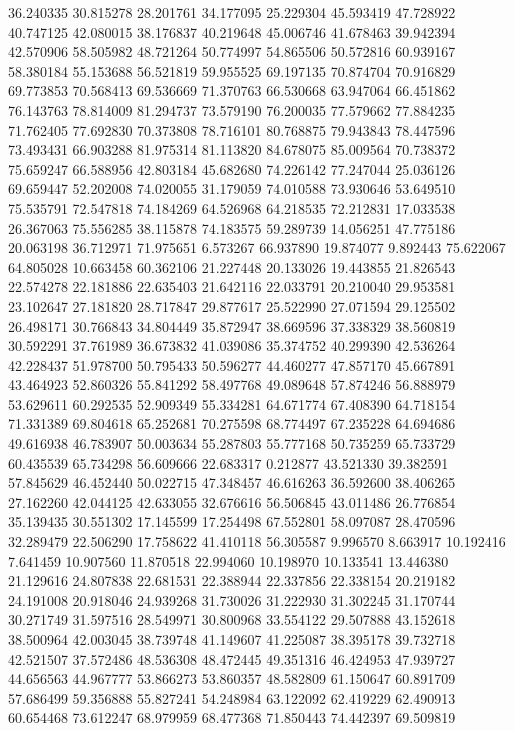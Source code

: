 36.240335
30.815278
28.201761
34.177095
25.229304
45.593419
47.728922
40.747125
42.080015
38.176837
40.219648
45.006746
41.678463
39.942394
42.570906
58.505982
48.721264
50.774997
54.865506
50.572816
60.939167
58.380184
55.153688
56.521819
59.955525
69.197135
70.874704
70.916829
69.773853
70.568413
69.536669
71.370763
66.530668
63.947064
66.451862
76.143763
78.814009
81.294737
73.579190
76.200035
77.579662
77.884235
71.762405
77.692830
70.373808
78.716101
80.768875
79.943843
78.447596
73.493431
66.903288
81.975314
81.113820
84.678075
85.009564
70.738372
75.659247
66.588956
42.803184
45.682680
74.226142
77.247044
25.036126
69.659447
52.202008
74.020055
31.179059
74.010588
73.930646
53.649510
75.535791
72.547818
74.184269
64.526968
64.218535
72.212831
17.033538
26.367063
75.556285
38.115878
74.183575
59.289739
14.056251
47.775186
20.063198
36.712971
71.975651
6.573267
66.937890
19.874077
9.892443
75.622067
64.805028
10.663458
60.362106
21.227448
20.133026
19.443855
21.826543
22.574278
22.181886
22.635403
21.642116
22.033791
20.210040
29.953581
23.102647
27.181820
28.717847
29.877617
25.522990
27.071594
29.125502
26.498171
30.766843
34.804449
35.872947
38.669596
37.338329
38.560819
30.592291
37.761989
36.673832
41.039086
35.374752
40.299390
42.536264
42.228437
51.978700
50.795433
50.596277
44.460277
47.857170
45.667891
43.464923
52.860326
55.841292
58.497768
49.089648
57.874246
56.888979
53.629611
60.292535
52.909349
55.334281
64.671774
67.408390
64.718154
71.331389
69.804618
65.252681
70.275598
68.774497
67.235228
64.694686
49.616938
46.783907
50.003634
55.287803
55.777168
50.735259
65.733729
60.435539
65.734298
56.609666
22.683317
0.212877
43.521330
39.382591
57.845629
46.452440
50.022715
47.348457
46.616263
36.592600
38.406265
27.162260
42.044125
42.633055
32.676616
56.506845
43.011486
26.776854
35.139435
30.551302
17.145599
17.254498
67.552801
58.097087
28.470596
32.289479
22.506290
17.758622
41.410118
56.305587
9.996570
8.663917
10.192416
7.641459
10.907560
11.870518
22.994060
10.198970
10.133541
13.446380
21.129616
24.807838
22.681531
22.388944
22.337856
22.338154
20.219182
24.191008
20.918046
24.939268
31.730026
31.222930
31.302245
31.170744
30.271749
31.597516
28.549971
30.800968
33.554122
29.507888
43.152618
38.500964
42.003045
38.739748
41.149607
41.225087
38.395178
39.732718
42.521507
37.572486
48.536308
48.472445
49.351316
46.424953
47.939727
44.656563
44.967777
53.866273
53.860357
48.582809
61.150647
60.891709
57.686499
59.356888
55.827241
54.248984
63.122092
62.419229
62.490913
60.654468
73.612247
68.979959
68.477368
71.850443
74.442397
69.509819

